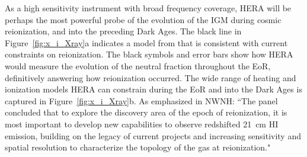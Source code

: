 \documentclass[preprint]{aastex}
\def\HI{{H{\small I }}}
\begin{document}
As a high sensitivity instrument with broad frequency coverage, HERA will be
perhaps the most powerful probe of the evolution of the IGM during
cosmic reionization, and into the preceding Dark Ages.
The black line in Figure~\ref{fig:x_i_Xray}a indicates a model
from \citet{robertson_2013} that is consistent with current constraints on
reionization. The black symbols and error bars show how HERA would measure the
evolution of the neutral fraction throughout the EoR, definitively answering
how reionization occurred. The wide range of heating and ionization models HERA
can constrain during the EoR and into the Dark Ages is captured in
Figure~\ref{fig:x_i_Xray}b. 
As emphasized in NWNH: ``The panel concluded that to explore the discovery
area of the epoch of reionization, it is most important to develop new
capabilities to observe redshifted 21~cm \HI emission, building on the legacy of
current projects and increasing sensitivity and spatial resolution to
characterize the topology of the gas at reionization."

\end{document}
